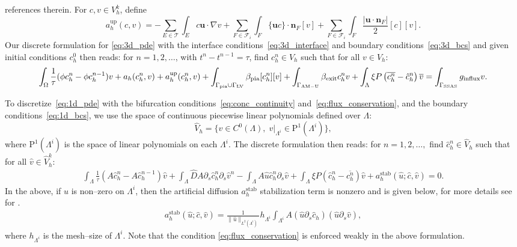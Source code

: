 \documentclass[fleqn,10pt]{wlscirep}
\begin{document}
references therein. For $c, v \in V_h^k$, define
\begin{equation}
  a_h^{\mathrm{up}}(c, v)
  = - \sum_{E \in \mathcal{T}} \int_E c\bm{u} \cdot \nabla v
  + \sum_{F \in \mathcal{F}_i } \int_F \{ \bm u  c\} \cdot \bm{n}_F [v] +
  \sum_{F \in \mathcal{F}_i} \int_F \frac{|\bm u \cdot \bm n_F|}{2} [c] [v] .
\end{equation}
Our discrete formulation for \eqref{eq:3d_pde} with the interface conditions~\eqref{eq:3d_interface} and boundary conditions~\eqref{eq:3d_bcs} and given initial conditions $c_h^0$ then reads: for $n = 1, 2, \dots$, with $t^n - t^{n-1} = \tau$, find $c_h^n \in V_h$ such that for all $v \in V_h$:
\begin{equation} \label{eq:3d_dg_disc}
  \int_{\Omega} \frac{1}{\tau} (\phi c_h^n - \phi c_h^{n-1}) v
  + a_h(c_h^n, v) + a_h^{\mathrm{up}}(c_h^n,v)
  + \int_{\Gamma_{\rm pia} \cup \Gamma_{\rm LV}} \beta_{\rm pia}[c_h^n][v] 
  + \int_{\Gamma_{\rm AM-U}} \beta_{\rm exit} c_h^n v 
  + \int_{\Lambda} \xi  P \left (\overline{c_h^n} - \hat c_h^n \right) \overline{v} 
  = 
  \int_{\Gamma_{\rm SSAS}} g_{\rm influx} v
  .
\end{equation}

To discretize~\eqref{eq:1d_pde} with the bifurcation
conditions~\eqref{eq:conc_continuity}
and~\eqref{eq:flux_conservation}, and the boundary
conditions~\eqref{eq:1d_bcs}, we use the space of continuous piecewise
linear polynomials defined over $\Lambda$:
\begin{equation}
  \hat V_h
  = \{ v \in C^0(\Lambda), \; v \vert_{\Lambda^i} \in \mathrm{P}^1(\Lambda^i) \}, 
\end{equation}
where $\mathrm{P}^1(\Lambda^i)$ is the space of linear polynomials on each $\Lambda^i$. The discrete formulation then reads: for $n = 1,2,\ldots, $ find $\hat c_h^n \in \hat V_h$ such that for all $\hat v \in \hat V_h^k$: 
\begin{align}\label{eq:1d_dg_disc}
\int_{\Lambda}  \frac{1}{\tau}(A  \hat c_h^n - A \hat c_h^{n-1}) \hat v  + \int_{\Lambda} \hat D A \partial_s \hat c_h^n  \partial_s \hat v^n - \int_{\Lambda} A \hat u \hat c_h^n \partial_s \hat v   +  \int_{\Lambda} \xi P (\hat c_h^n - \overline{c_h^n}) \hat v +a_h^{\mathrm{stab}}(\hat u; \hat c, \hat v) = 0.  
\end{align}
 In the above, if $\hat u$ is non--zero on $\Lambda^i$, then the artificial diffusion $a_h^{\mathrm{stab}}$ stabilization term is nonzero  and is given below, for more details see for  \cite[Section 12.6]{quarteroni2009numerical}. 
 \begin{align}
    a_h^{\mathrm{stab}}(\hat u; \hat c, \hat v) =  \frac{1}{\|\hat u\|_{L^2(\Lambda^i)}} 
 h_{\Lambda^i} \int_{\Lambda^i} A (\hat u \partial_s \hat c_h  ) (\hat u \partial_s \hat v),  
 \end{align}
 where $h_{\Lambda^i}$ is the mesh--size of $\Lambda^i$.
Note that the condition \eqref{eq:flux_conservation} is enforced weakly in the above formulation.
\end{document}
